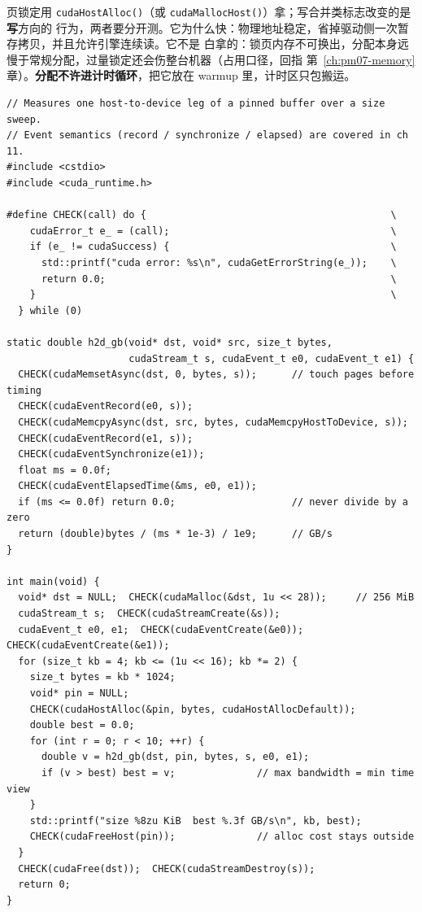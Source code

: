 \documentclass[12pt,a4paper,fontset=fandol]{ctexbook}
\newcommand{\Fn}[1]{\texttt{#1()}}
\begin{document}
页锁定用 \Fn{cudaHostAlloc}（或 \Fn{cudaMallocHost}）拿；写合并类标志改变的是\textbf{写}方向的
行为，两者要分开测。它为什么快：物理地址稳定，省掉驱动侧一次暂存拷贝，并且允许引擎连续读。它不是
白拿的：锁页内存不可换出，分配本身远慢于常规分配，过量锁定还会伤整台机器（占用口径，回指
第~\ref{ch:pm07-memory} 章）。\textbf{分配不许进计时循环}，把它放在 warmup 里，计时区只包搬运。

\begin{lstlisting}[style=cppstyle,caption={单段主机到设备拷贝的带宽测量骨架：计时边界与 event 语义取自第~\ref{ch:pm11-gpu} 章},label={lst:pm12-h2d}]
// Measures one host-to-device leg of a pinned buffer over a size sweep.
// Event semantics (record / synchronize / elapsed) are covered in ch 11.
#include <cstdio>
#include <cuda_runtime.h>

#define CHECK(call) do {                                          \
    cudaError_t e_ = (call);                                      \
    if (e_ != cudaSuccess) {                                      \
      std::printf("cuda error: %s\n", cudaGetErrorString(e_));    \
      return 0.0;                                                 \
    }                                                             \
  } while (0)

static double h2d_gb(void* dst, void* src, size_t bytes,
                     cudaStream_t s, cudaEvent_t e0, cudaEvent_t e1) {
  CHECK(cudaMemsetAsync(dst, 0, bytes, s));      // touch pages before timing
  CHECK(cudaEventRecord(e0, s));
  CHECK(cudaMemcpyAsync(dst, src, bytes, cudaMemcpyHostToDevice, s));
  CHECK(cudaEventRecord(e1, s));
  CHECK(cudaEventSynchronize(e1));
  float ms = 0.0f;
  CHECK(cudaEventElapsedTime(&ms, e0, e1));
  if (ms <= 0.0f) return 0.0;                    // never divide by a zero
  return (double)bytes / (ms * 1e-3) / 1e9;      // GB/s
}

int main(void) {
  void* dst = NULL;  CHECK(cudaMalloc(&dst, 1u << 28));     // 256 MiB
  cudaStream_t s;  CHECK(cudaStreamCreate(&s));
  cudaEvent_t e0, e1;  CHECK(cudaEventCreate(&e0)); CHECK(cudaEventCreate(&e1));
  for (size_t kb = 4; kb <= (1u << 16); kb *= 2) {
    size_t bytes = kb * 1024;
    void* pin = NULL;
    CHECK(cudaHostAlloc(&pin, bytes, cudaHostAllocDefault));
    double best = 0.0;
    for (int r = 0; r < 10; ++r) {
      double v = h2d_gb(dst, pin, bytes, s, e0, e1);
      if (v > best) best = v;              // max bandwidth = min time view
    }
    std::printf("size %8zu KiB  best %.3f GB/s\n", kb, best);
    CHECK(cudaFreeHost(pin));              // alloc cost stays outside
  }
  CHECK(cudaFree(dst));  CHECK(cudaStreamDestroy(s));
  return 0;
}
\end{lstlisting}
\end{document}
